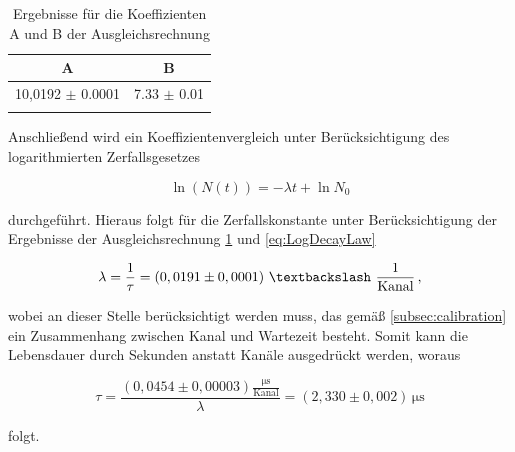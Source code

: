 \begin{table}[h!]
  \centering
\begin{tabular}{cc} \toprule
A   & B  \\ \midrule
10,0192 $\pm$ 0.0001 & 7.33 $\pm$ 0.01 \\
\bottomrule
\label{tab:Fit}
\end{tabular}
\caption{Ergebnisse für die Koeffizienten A und B der Ausgleichsrechnung}
\end{table}

Anschließend wird ein Koeffizientenvergleich unter Berücksichtigung des logarithmierten Zerfallsgesetzes

\begin{equation}
\ln(N(t)) = -\lambda t + \ln{N_0}
\label{eq:LogDecayLaw}
\end{equation}

\noindent durchgeführt. Hieraus folgt für die Zerfallskonstante unter Berücksichtigung der Ergebnisse der Ausgleichsrechnung \ref{tab:Fit} und \ref{eq:LogDecayLaw}

\begin{equation}
\lambda = \frac{1}{\tau} = (0,0191 \pm 0,0001) \,\, \textbackslash \,\, \frac{1}{\text{Kanal}}\,,
\end{equation}

\noindent wobei an dieser Stelle berücksichtigt werden muss, das gemäß \ref{subsec:calibration} ein Zusammenhang zwischen Kanal und Wartezeit besteht. Somit kann
die Lebensdauer durch Sekunden anstatt Kanäle ausgedrückt werden, woraus

\begin{equation}
\tau = \frac{(0,0454 \pm 0,00003) \frac{\si{\micro\second}}{\text{Kanal}}}{\lambda} = (2,330 \pm 0,002) \, \si{\micro\second}
\end{equation}

\noindent folgt.
